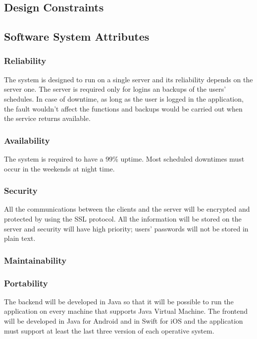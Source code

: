 \subsection{Design Constraints}

\subsection{Software System Attributes}
\subsubsection{Reliability}
The system is designed to run on a single server and its reliability depends on the server one. The server is required only for logins an backups of the users’ schedules.
In case of downtime, as long as the user is logged in the application, the fault wouldn’t affect the functions and backups would be carried out when the service returns available.

\subsubsection{Availability}
The system is required to have a 99\% uptime. Most scheduled downtimes must occur in the weekends at night time.

\subsubsection{Security}
All the communications between the clients and the server will be encrypted and protected by using the SSL protocol.
All the information will be stored on the server and security will have high priority; users’ passwords will not be stored in plain text.

\subsubsection{Maintainability}

\subsubsection{Portability}
The backend will be developed in Java so that it will be possible to run the application on every machine that supports Java Virtual Machine.
The frontend will be developed in Java for Android and in Swift for iOS and the application must support at least the last three version of each operative system.


